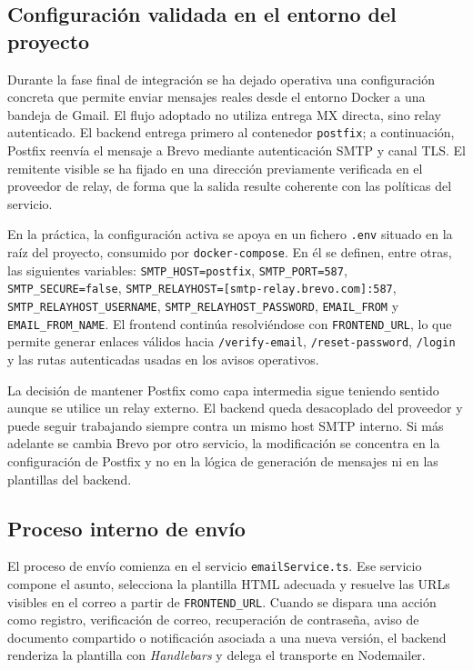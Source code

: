 \documentclass[11pt, a4paper]{article}
\begin{document}
\subsection{Configuración validada en el entorno del proyecto}

Durante la fase final de integración se ha dejado operativa una configuración concreta que permite enviar mensajes reales desde el entorno Docker a una bandeja de Gmail. El flujo adoptado no utiliza entrega MX directa, sino relay autenticado. El backend entrega primero al contenedor \texttt{postfix}; a continuación, Postfix reenvía el mensaje a Brevo mediante autenticación SMTP y canal TLS. El remitente visible se ha fijado en una dirección previamente verificada en el proveedor de relay, de forma que la salida resulte coherente con las políticas del servicio.

En la práctica, la configuración activa se apoya en un fichero \texttt{.env} situado en la raíz del proyecto, consumido por \texttt{docker-compose}. En él se definen, entre otras, las siguientes variables: \texttt{SMTP\_HOST=postfix}, \texttt{SMTP\_PORT=587}, \texttt{SMTP\_SECURE=false}, \texttt{SMTP\_RELAYHOST=[smtp-relay.brevo.com]:587}, \texttt{SMTP\_RELAYHOST\_USERNAME}, \texttt{SMTP\_RELAYHOST\_PASSWORD}, \texttt{EMAIL\_FROM} y \texttt{EMAIL\_FROM\_NAME}. El frontend continúa resolviéndose con \texttt{FRONTEND\_URL}, lo que permite generar enlaces válidos hacia \texttt{/verify-email}, \texttt{/reset-password}, \texttt{/login} y las rutas autenticadas usadas en los avisos operativos.

La decisión de mantener Postfix como capa intermedia sigue teniendo sentido aunque se utilice un relay externo. El backend queda desacoplado del proveedor y puede seguir trabajando siempre contra un mismo host SMTP interno. Si más adelante se cambia Brevo por otro servicio, la modificación se concentra en la configuración de Postfix y no en la lógica de generación de mensajes ni en las plantillas del backend.

\subsection{Proceso interno de envío}

El proceso de envío comienza en el servicio \texttt{emailService.ts}. Ese servicio compone el asunto, selecciona la plantilla HTML adecuada y resuelve las URLs visibles en el correo a partir de \texttt{FRONTEND\_URL}. Cuando se dispara una acción como registro, verificación de correo, recuperación de contraseña, aviso de documento compartido o notificación asociada a una nueva versión, el backend renderiza la plantilla con \textit{Handlebars} y delega el transporte en Nodemailer.
\end{document}
